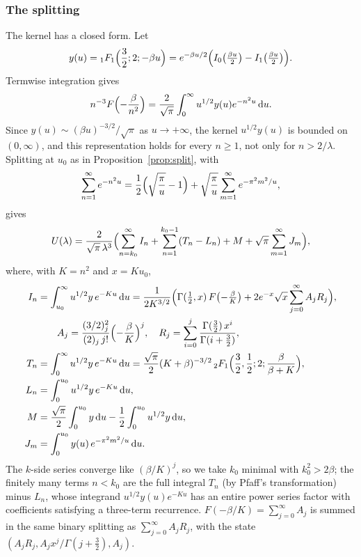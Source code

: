 \documentclass[11pt]{amsart}
\theoremstyle{definition}
\theoremstyle{remark}
\newcommand{\dd}{\,\mathrm{d}}
\begin{document}
\subsubsection{The splitting}
The kernel has a closed form. Let
\[
  y(u) = {}_1F_1\Bigl(\frac32; 2; -\beta u\Bigr) = e^{-\beta u/2}\Bigl(I_0\bigl(\tfrac{\beta u}{2}\bigr) - I_1\bigl(\tfrac{\beta u}2\bigr)\Bigr).
\]
Termwise integration gives
\[
  n^{-3}F\Bigl(-\frac\beta{n^2}\Bigr) = \frac{2}{\sqrt\pi}\int_0^\infty u^{1/2}y(u)e^{-n^2u}\dd u.
\]
Since
$y(u) \sim (\beta u)^{-3/2}/\sqrt\pi$ as $u \to +\infty$, the kernel $u^{1/2}y(u)$ is bounded on $(0,\infty)$, and this
representation holds for every $n \ge 1$, not only for $n > 2/\lambda$. Splitting at $u_0$ as in
Proposition~\ref{prop:split}, with
\[
  \sum_{n=1}^{\infty}e^{-n^2u} = \frac12\Bigl(\sqrt{\frac\pi u} - 1\Bigr) + \sqrt{\frac\pi u}\sum_{m=1}^{\infty}e^{-\pi^2m^2/u},
\]
gives
\[
  U(\lambda) = \frac{2}{\sqrt\pi\,\lambda^3}\Bigl(\sum_{n=k_0}^{\infty}I_n + \sum_{n=1}^{k_0-1}(T_n - L_n) + M + \sqrt\pi\sum_{m=1}^{\infty}J_m\Bigr),
\]
where, with $K = n^2$ and $x = Ku_0$,
\begin{align*}
  I_n &= \int_{u_0}^\infty u^{1/2}y\,e^{-Ku}\dd u
       = \frac{1}{2K^{3/2}}\Bigl(\Gamma(\tfrac12, x)\,F\bigl(-\tfrac\beta K\bigr)
         + 2e^{-x}\sqrt x\sum_{j=0}^{\infty}A_jR_j\Bigr), \\
  &\qquad A_j = \frac{(3/2)_j^2}{(2)_j\,j!}\Bigl(-\frac\beta K\Bigr)^j, \quad R_j = \sum_{i=0}^{j}\frac{\Gamma(\frac32)\,x^i}{\Gamma(i+\frac32)}, \\
  T_n &= \int_0^\infty u^{1/2}y\,e^{-Ku}\dd u = \frac{\sqrt\pi}{2}(K+\beta)^{-3/2}\,{}_2F_1\Bigl(\frac32,\frac12;2;\frac{\beta}{\beta+K}\Bigr), \\
  L_n &= \int_0^{u_0}u^{1/2}y\,e^{-Ku}\dd u, \\
  M &= \frac{\sqrt\pi}2\int_0^{u_0}y\dd u - \frac12\int_0^{u_0}u^{1/2}y\dd u, \\
  J_m &= \int_0^{u_0}y(u)\,e^{-\pi^2m^2/u}\dd u .
\end{align*}
The $k$-side series converge like $(\beta/K)^j$, so we take $k_0$ minimal with $k_0^2 > 2\beta$; the finitely many terms
$n < k_0$ are the full integral $T_n$ (by Pfaff's transformation) minus $L_n$, whose integrand $u^{1/2}y(u)e^{-Ku}$ has an
entire power series factor with coefficients satisfying a three-term recurrence. $F(-\beta/K) = \sum_{j=0}^{\infty}A_j$ is summed in the
same binary splitting as $\sum_{j=0}^{\infty}A_jR_j$, with the state $(A_jR_j, A_jx^j/\Gamma(j+\frac32), A_j)$.
\end{document}
